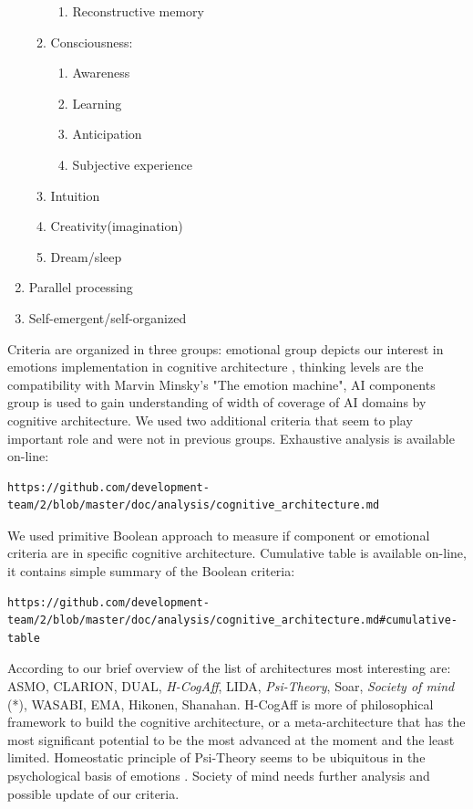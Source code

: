 \begin{enumerate}
\begin{enumerate}
\begin{enumerate}
   \item  Reconstructive memory
  \end{enumerate}
  \item  Consciousness:
  \begin{enumerate}
   \item  Awareness
   \item  Learning
   \item  Anticipation
   \item  Subjective experience
  \end{enumerate}
  \item  Intuition
  \item  Creativity(imagination)
  \item  Dream/sleep
 \end{enumerate}
 \item  Parallel processing
 \item  Self-emergent/self-organized
\end{enumerate}

Criteria are organized in three groups: emotional group depicts our interest in emotions implementation in cognitive architecture \cite{computationalmodelsemotionscognition}, thinking levels are the compatibility with Marvin Minsky's "The emotion machine", AI components group is used to gain understanding of width of coverage of AI domains by cognitive architecture. We used two additional criteria that seem to play important role and were not in previous groups. Exhaustive analysis is available on-line:

\begin{verbatim}
https://github.com/development-team/2/blob/master/doc/analysis/cognitive_architecture.md
\end{verbatim}

We used primitive Boolean approach to measure if component or emotional criteria are in specific cognitive architecture. Cumulative table is available on-line, it contains simple summary of the Boolean criteria:

\begin{verbatim}
https://github.com/development-team/2/blob/master/doc/analysis/cognitive_architecture.md#cumulative-table
\end{verbatim}

According to our brief overview of the list of architectures most interesting are: ASMO, CLARION, DUAL, \emph{H-CogAff}, LIDA, \emph{Psi-Theory}, Soar, \emph{Society of mind} (*), WASABI, EMA, Hikonen, Shanahan.
H-CogAff is more of philosophical framework to build the cognitive architecture, or a meta-architecture that has the most significant potential to be the most advanced at the moment and the least limited. Homeostatic principle of Psi-Theory seems to be ubiquitous in the psychological basis of emotions \cite{natureofemotions}. Society of mind needs further analysis and possible update of our criteria.

